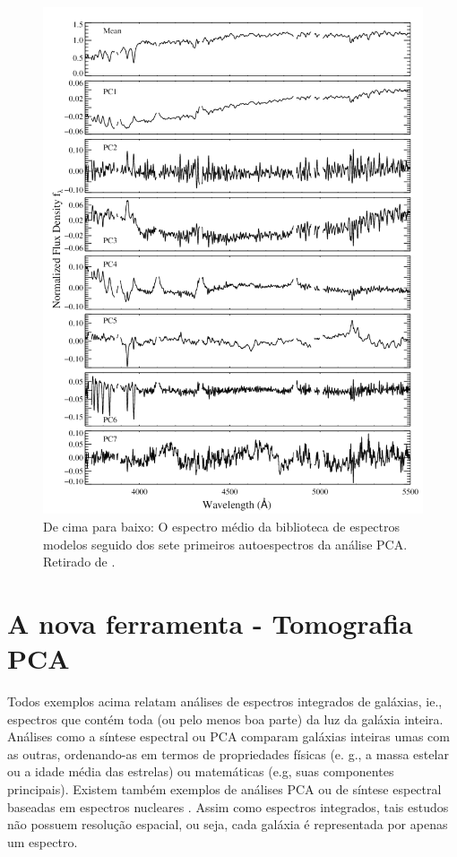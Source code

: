 \begin{figure}
    \includegraphics[height=1.\textwidth]{figuras/figChen2012fig2.pdf}
    \caption[Espectro médio e 7 primeiras PCs de uma biblioteca de modelos.]
    {De cima para baixo: O espectro médio da biblioteca de espectros modelos seguido dos sete primeiros autoespectros
    da análise PCA. Retirado de \citet{Chen2012}.}
    \label{fig:Chen2012fig2}
\end{figure}

\section{A nova ferramenta - Tomografia PCA}
\label{sec:Intro:TomoPCA}

Todos exemplos acima relatam análises de espectros integrados de galáxias, ie., espectros que contém toda (ou pelo menos
boa parte) da luz da galáxia inteira. Análises como a síntese espectral ou PCA comparam galáxias inteiras umas com as
outras, ordenando-as em termos de propriedades físicas (e. g., a massa estelar ou a idade média das estrelas) ou
matemáticas (e.g, suas componentes principais). Existem também exemplos de análises PCA ou de síntese espectral baseadas
em espectros nucleares \citep[e.g., ][]{Trager2000I, CidFernandes2004}. Assim como espectros integrados, tais estudos
não possuem resolução espacial, ou seja, cada galáxia é representada por apenas um espectro.

